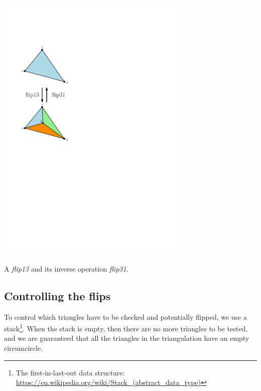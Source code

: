 \begin{marginfigure}
  \centering
  \includegraphics[width=0.7\textwidth]{flip13}
  \caption{A \emph{flip13} and its inverse operation \emph{flip31}.}%
\label{fig:flip13}
\end{marginfigure}


\subsection{Controlling the flips}
To control which triangles have to be checked and potentially flipped, we use a stack\footnote{The first-in-last-out data structure: \url{https://en.wikipedia.org/wiki/Stack_(abstract_data_type)}}. 
When the stack is empty, then there are no more triangles to be tested, and we are guaranteed that all the triangles in the triangulation have an empty circumcircle.


